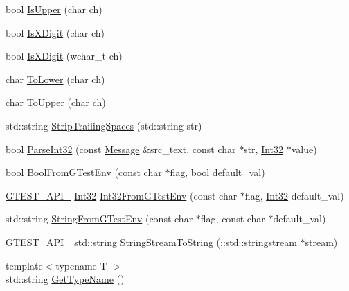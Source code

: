 \begin{DoxyCompactItemize}
bool \hyperlink{namespacetesting_1_1internal_a84f3baa379fec6bf5947cb5165aa8cc9}{Is\+Upper} (char ch)
\item 
bool \hyperlink{namespacetesting_1_1internal_aa234ef141278263fb143b616c74c86e7}{Is\+X\+Digit} (char ch)
\item 
bool \hyperlink{namespacetesting_1_1internal_a6ab68a30f8291c09b2289c132bbe3b16}{Is\+X\+Digit} (wchar\+\_\+t ch)
\item 
char \hyperlink{namespacetesting_1_1internal_ad9c627ef2a94245e3fd69e7ab3d49b42}{To\+Lower} (char ch)
\item 
char \hyperlink{namespacetesting_1_1internal_ac1b876a8133895bd553d4780ecaa1e3a}{To\+Upper} (char ch)
\item 
std\+::string \hyperlink{namespacetesting_1_1internal_aa6afda12e567c353e2e9b9c2e8cae14f}{Strip\+Trailing\+Spaces} (std\+::string str)
\item 
bool \hyperlink{namespacetesting_1_1internal_ac06fc81336a3d80755f4020d34321766}{Parse\+Int32} (const \hyperlink{classtesting_1_1Message}{Message} \&src\+\_\+text, const char $\ast$str, \hyperlink{namespacetesting_1_1internal_a8ee38faaf875f133358abaf9bc056cec}{Int32} $\ast$value)
\item 
bool \hyperlink{namespacetesting_1_1internal_a67132cdce23fb71b6c38ee34ef81eb4c}{Bool\+From\+G\+Test\+Env} (const char $\ast$flag, bool default\+\_\+val)
\item 
\hyperlink{gtest-port_8h_aa73be6f0ba4a7456180a94904ce17790}{G\+T\+E\+S\+T\+\_\+\+A\+P\+I\+\_\+} \hyperlink{namespacetesting_1_1internal_a8ee38faaf875f133358abaf9bc056cec}{Int32} \hyperlink{namespacetesting_1_1internal_a0f7e728793f9e6cb0aa2b69eaa468bf3}{Int32\+From\+G\+Test\+Env} (const char $\ast$flag, \hyperlink{namespacetesting_1_1internal_a8ee38faaf875f133358abaf9bc056cec}{Int32} default\+\_\+val)
\item 
std\+::string \hyperlink{namespacetesting_1_1internal_ac54dabc540bf79c2de91add679bfb93b}{String\+From\+G\+Test\+Env} (const char $\ast$flag, const char $\ast$default\+\_\+val)
\item 
\hyperlink{gtest-port_8h_aa73be6f0ba4a7456180a94904ce17790}{G\+T\+E\+S\+T\+\_\+\+A\+P\+I\+\_\+} std\+::string \hyperlink{namespacetesting_1_1internal_ac0a2b7f69fc829d80a39e925b6417e39}{String\+Stream\+To\+String} (\+::std\+::stringstream $\ast$stream)
\item 
{\footnotesize template$<$typename T $>$ }\\std\+::string \hyperlink{namespacetesting_1_1internal_a635606b4731f843c86ec8ca51cab83a1}{Get\+Type\+Name} ()

\end{DoxyCompactItemize}
